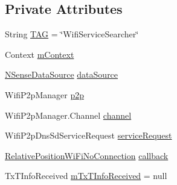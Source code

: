 \subsection*{Private Attributes}
\begin{DoxyCompactItemize}
\item 
String \hyperlink{classcs_1_1nsense_1_1location_1_1_wifi_service_searcher_af93ca1c31745948edca0ce6177fe0eb3}{T\-A\-G} = \char`\"{}Wifi\-Service\-Searcher\char`\"{}
\item 
Context \hyperlink{classcs_1_1nsense_1_1location_1_1_wifi_service_searcher_aa067e3bd1682b7cb95f671a19e662c42}{m\-Context}
\item 
\hyperlink{classcs_1_1nsense_1_1db_1_1_n_sense_data_source}{N\-Sense\-Data\-Source} \hyperlink{classcs_1_1nsense_1_1location_1_1_wifi_service_searcher_aac635f7d18b5e3d913052ef023030f16}{data\-Source}
\item 
Wifi\-P2p\-Manager \hyperlink{classcs_1_1nsense_1_1location_1_1_wifi_service_searcher_a4d7da832573db92080e064fe61068dc1}{p2p}
\item 
Wifi\-P2p\-Manager.\-Channel \hyperlink{classcs_1_1nsense_1_1location_1_1_wifi_service_searcher_a1f377051b70810f0b5c6f373e7c30f96}{channel}
\item 
Wifi\-P2p\-Dns\-Sd\-Service\-Request \hyperlink{classcs_1_1nsense_1_1location_1_1_wifi_service_searcher_ab2e780a9115f0114f5097bb277eb0293}{service\-Request}
\item 
\hyperlink{classcs_1_1nsense_1_1location_1_1_relative_position_wi_fi_no_connection}{Relative\-Position\-Wi\-Fi\-No\-Connection} \hyperlink{classcs_1_1nsense_1_1location_1_1_wifi_service_searcher_aad31a938d8f3998424053d7da9ae0f60}{callback}
\item 
Tx\-T\-Info\-Received \hyperlink{classcs_1_1nsense_1_1location_1_1_wifi_service_searcher_a208c19d0746aaf63777a00a65b8a5803}{m\-Tx\-T\-Info\-Received} = null
\end{DoxyCompactItemize}


